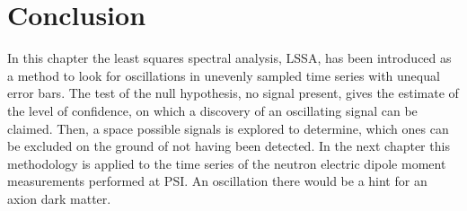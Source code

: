 \section{Conclusion}
In this chapter the least squares spectral analysis, LSSA, has been introduced as a method to look for oscillations in unevenly sampled time series with unequal error bars. The test of the null hypothesis, no signal present, gives the estimate of the level of confidence, on which a discovery of an oscillating signal can be claimed. Then, a space possible signals is explored to determine, which ones can be excluded on the ground of not having been detected. In the next chapter this methodology is applied to the time series of the neutron electric dipole moment measurements performed at PSI\@. An oscillation there would be a hint for an axion dark matter.
